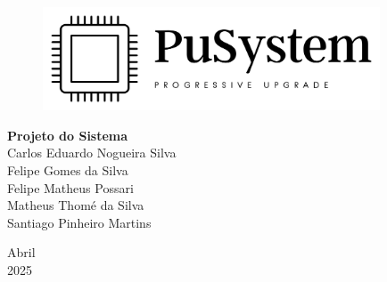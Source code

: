\documentclass[a5paper, 12pt]{article}
\begin{document}

\begin{titlepage}
	\begin{center}
	
	\begin{figure}[!ht]
	\centering
	\includegraphics[width=10cm]{Logo Transparente Preto.png} \\ 
    \end{figure}

        
		\vspace{115pt}
        \textbf{\Huge{Projeto do Sistema}}\\
        
		\vspace{115pt}
        Carlos Eduardo Nogueira Silva \\
        Felipe Gomes da Silva \\
        Felipe Matheus Possari \\
        Matheus Thomé da Silva\\ 
        Santiago Pinheiro Martins \\
	\end{center}
	
	
	\vspace{1cm}
	\begin{center}
		\vspace{\fill}
		 Abril \\
		 2025
			\end{center}
\end{titlepage}


\newpage
\thispagestyle{empty}
\tableofcontents

\newpage
\pagestyle{fancy}

\fancyhead[L]{\thepage}
\fancyhead[C]{\nouppercase{\leftmark}}
\fancyfoot[R]{}
\fancyfoot[L]{}
\setlength\headheight{26pt}
\end{document}
